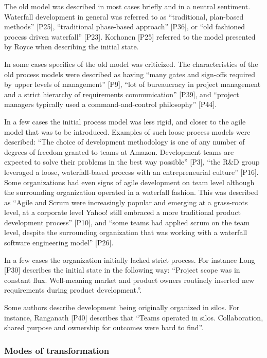 \documentclass[preprint,authoryear,12pt]{elsarticle}
\begin{document}
The old model was described in most cases briefly and in a neutral sentiment.
Waterfall development in general was referred to as ``traditional, plan-based
methods'' [P25], ``traditional phase-based approach'' [P36], or ``old fashioned
process driven waterfall'' [P23]. Korhonen [P25] referred to the model presented
by Royce \cite{Royce1970} when describing the initial state.

In some cases specifics of the old model was criticized. The characteristics of
the old process models were described as having ``many gates and sign-offs
required by upper levels of management'' [P9], ``lot of bureaucracy in project
management and a strict hierarchy of requirements communication'' [P39], and
``project managers typically used a command-and-control philosophy'' [P44].

In a few cases the initial process model was less rigid, and closer to the agile
model that was to be introduced. Examples of such loose process models were
described: ``The choice of development methodology is one of any number of
degrees of freedom granted to teams at Amazon. Development teams are expected to
solve their problems in the best way possible'' [P3], ``the R\&D group leveraged
a loose, waterfall-based process with an entrepreneurial culture'' [P16]. Some
organizations had even signs of agile development on team level although the
surrounding organization operated in a waterfall fashion. This was described as
``Agile and Scrum were increasingly popular and emerging at a grass-roots level,
at a corporate level Yahoo! still embraced a more traditional product
development process'' [P10], and ``some teams had applied scrum on the team
level, despite the surrounding organization that was working with a waterfall
software engineering model'' [P26].

In a few cases the organization initially lacked strict process. For instance
Long [P30] describes the initial state in the following way: ``Project scope was
in constant flux. Well-meaning market and product owners routinely inserted new
requirements during product development.''.

Some authors describe development being originally organized in silos. For
instance, Ranganath [P40] describes that ``Teams operated in silos.
Collaboration, shared purpose and ownership for outcomes were hard to find''.


\subsubsection{Modes of transformation}
\end{document}
